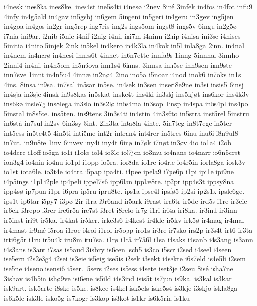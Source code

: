 i4nesk
ines8ka
ines8ke.
ines4st
ine5s4ti
i4nes^^f8
i2nev
8in^^e9
3infek
in4fos
in4fot
infu9
4infy
in4g5ald
in4gav
in5gebj
in6gem
5ingeni
in5geri
in4geru
in3gev
ing5jen
in4goa
in4gos
in2gr
ing5rep
ing7ris
ing2s
ings5om
ingst8
ings5v
6ingu
in2g5^^f8
i7nia
ini9ar.
i2nib
i5nie
i4nif
i2nig
i4nil
ini7m
i4ninn
i2nip
i4nisa
ini3se
i4nises
5initia
i4nito
5injek
2ink
in5kel
in4kero
in4k3la
in4kok
in5l
inla8ga
2inn.
in4nal
in4nem
in4ner^^f8
in4nesi
innes6t
4innet
in6n7ette
innfa9s
1inng
5innhal
3innho
2inni4
in4ni.
in4n5om
in5n6ova
inn1s4
6inns.
3innsa
inn5se
inn9sen
inn9ste
inn7sve
1innt
in4n5u4
4inn^^e6
in2n^^f84
2ino
ino5a
i5noar
i4nod
inok6
in7oks
in1s
4ins.
8insa
in9sa.
in7sal
in5sar
in5se.
in4sek
in3sen
inseri8e9ne
in3si
insis5
6insj
in4sja
in3sje
4insk
in9s8kas
in5skat
inske4t
ins4ki
in3skj
ins5kj^^f8t
ins6kor
ins4k3v
ins6k^^f8
insle7g
ins8lega
in3slo
in3s2l^^f8
in5s4ma
in3sop
1insp
in4spa
in5s4pl
ins4po
5instal
in8s5te.
ins5ten.
ins9tens
3in3s4ti
in4stin
4in3s6to
in5stra
inst5rel
5instru
in6st^^e5
in7sul
in2sv
6in3sy
8int.
2in3ta
inta8la
4inte.
5in7teg
in8t7ege
in5ter
int5ess
in5te4t5
4in5ti
inti5me
int2r
intran4
int4rer
in5tres
6inu
inu6i
i8n9ul8
in7ut.
in9u8te
1inv
6invev
iny4i
iny4t
6in^^f8
in7^^f8k
i7n^^f8t
in3^^f8v
4io
io1a4
i2ob
io4dere
i1off
io5gn
io1i
i1oks
iol4
io3le
iol7jen
io3mu
io4nans
io4narr
io6n5erst
ion3g4
io4nin
io4nu
io1pl
i1opp
io5ra.
ior8da
io1re
io4rie
io4r5in
iorla8ga
iosk3v
io1st
iota6le.
io3t4e
io4tra
i5pap
ipa4ti.
i4pee
ipela9
i7pe6p
i1pi
ipi1e
ipi9ne
i4p5ings
i1pl
i2ple
ip4peli
ippel7s6
ipp6lan
ippl^^e68re.
ip2pr
ipp4s3t
ippsy8na
ipp4s^^f8
ip7pun
i1pr
i6pra
ip5ru
ipru8te.
ips1a
ipse4l
ipsf^^f85
ip2si
ip2s1k
ipsle6ge.
ips1t
ip6tar
i5py7
i3p^^f8
2ir
i1ra
i9r6and
ir5ark
i9rast
ira6tr
ir5de
ird5s
i1re
ir3eie
ir6ek
i3repo
i3rer
ire6r5a
ire7st
i3ret
i8reto
ir7g
i1ri
iri4a
iri8ka.
ir3ind
ir3inn
ir5inst
iri9t
ir5ka.
ir4kat
ir5ker.
irke3s6
ir4kest
ir4kle
ir5kv
irk5^^f8
ir4mag
ir4mal
ir4mast
ir9m^^e9
i5roa
i1roe
i4roi
i1rol
ir5opp
iro1s
ir3re
ir7sko
irs2p
ir3s4t
irt6
ir3ta
irti6g5r
i1ru
ir5u4k
iru8m
iru7sa.
i1r^^f8
i1r^^e5
ir7^^e56l
i1sa
i4saks
i4sanb
i4s3ang
is3ann
i4s3ans
is3ant
i7sas
is5aud
3isbry
is6cen
isch5
is3co
i5scr
i2sed
i4seel
i4seen
ise5ern
i2s2e3g4
i2sei
is3eie
is5eig
ise5is
i2sek
i3sekt
i4sekte
i6s7eld
is4e5li
i2sem
ise5ne
i4seno
isensi6
i5ser.
i5sers
i2ses
is5ess
i4sete
iset8je
i2seu
8is^^e9
isha7ne
3ishav
is4h5in
ish^^f89ve
isi6ene
is5ild
i4s3ind
isis5t
is7jun
is9ka.
is3kal
is3kar
isk9art.
isk5arte
i8ske
is5ke.
is8kee
is4kel
isk5els
iske5s4
is3kje
i3skjo
iskla8ga
is6k5le
isk3lo
isko5g
is7kogr
is3kop
is3kot
is1kr
is6k5rin
is1ku
